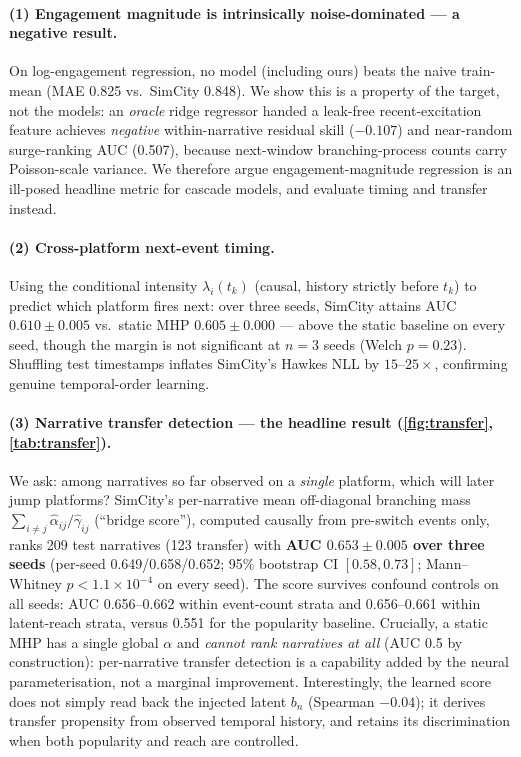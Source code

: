 \documentclass[11pt]{article}
\begin{document}
\paragraph{(1) Engagement magnitude is intrinsically noise-dominated --- a
negative result.} On log-engagement regression, no model (including ours)
beats the naive train-mean (MAE 0.825 vs.\ SimCity 0.848). We show this is a
property of the target, not the models: an \emph{oracle} ridge regressor handed
a leak-free recent-excitation feature achieves \emph{negative} within-narrative
residual skill ($-0.107$) and near-random surge-ranking AUC (0.507), because
next-window branching-process counts carry Poisson-scale variance. We therefore
argue engagement-magnitude regression is an ill-posed headline metric for
cascade models, and evaluate timing and transfer instead.

\paragraph{(2) Cross-platform next-event timing.} Using the conditional
intensity $\lambda_i(t_k)$ (causal, history strictly before $t_k$) to predict
which platform fires next: over three seeds, SimCity attains AUC
$0.610 \pm 0.005$ vs.\ static MHP $0.605 \pm 0.000$ --- above the static
baseline on every seed, though the margin is not significant at $n{=}3$ seeds
(Welch $p = 0.23$). Shuffling test timestamps inflates SimCity's Hawkes NLL by
$15$--$25\times$, confirming genuine temporal-order learning.

\paragraph{(3) Narrative transfer detection --- the headline result
(\cref{fig:transfer}, \cref{tab:transfer}).} We ask:
among narratives so far observed on a \emph{single} platform, which will later
jump platforms? SimCity's per-narrative mean off-diagonal branching mass
$\sum_{i \ne j} \hat\alpha_{ij}/\hat\gamma_{ij}$ (``bridge score''), computed
causally from pre-switch events only, ranks 209 test narratives (123 transfer)
with \textbf{AUC $0.653 \pm 0.005$ over three seeds} (per-seed 0.649/0.658/0.652;
95\% bootstrap CI $[0.58, 0.73]$; Mann--Whitney $p < 1.1\times10^{-4}$ on every
seed). The score survives confound controls on all seeds: AUC 0.656--0.662
within event-count strata and 0.656--0.661 within latent-reach strata, versus
0.551 for the popularity baseline. Crucially, a
static MHP has a single global $\alpha$ and \emph{cannot rank narratives at
all} (AUC 0.5 by construction): per-narrative transfer detection is a
capability added by the neural parameterisation, not a marginal improvement.
Interestingly, the learned score does not simply read back the injected latent
$b_n$ (Spearman $-0.04$); it derives transfer propensity from observed
temporal history, and retains its discrimination when both popularity and
reach are controlled.
\end{document}
